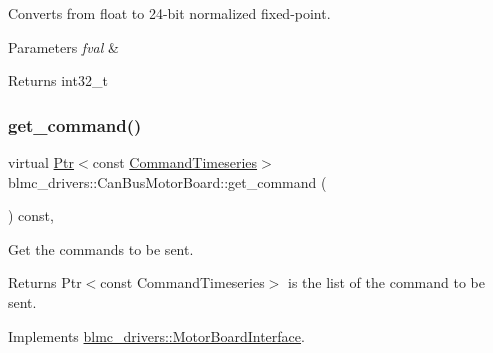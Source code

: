 Converts from float to 24-\/bit normalized fixed-\/point. 


\begin{DoxyParams}{Parameters}
{\em fval} & \\
\hline
\end{DoxyParams}
\begin{DoxyReturn}{Returns}
int32\+\_\+t 
\end{DoxyReturn}
\mbox{\label{classblmc__drivers_1_1CanBusMotorBoard_ac7adb4e5074229bb38e1c288702321e4}} 
\subsubsection{\texorpdfstring{get\+\_\+command()}{get\_command()}}
{\footnotesize\ttfamily virtual \hyperlink{classblmc__drivers_1_1MotorBoardInterface_a6a733b7ed7a3a96f6b0712b6bb5307f8}{Ptr}$<$const \hyperlink{classblmc__drivers_1_1MotorBoardInterface_ae2afe94a023d9f08a4c689e9b7660f15}{Command\+Timeseries}$>$ blmc\+\_\+drivers\+::\+Can\+Bus\+Motor\+Board\+::get\+\_\+command (\begin{DoxyParamCaption}{ }\end{DoxyParamCaption}) const\hspace{0.3cm}{\ttfamily [inline]}, {\ttfamily [virtual]}}



Get the commands to be sent. 

\begin{DoxyReturn}{Returns}
Ptr$<$const Command\+Timeseries$>$ is the list of the command to be sent. 
\end{DoxyReturn}


Implements \hyperlink{classblmc__drivers_1_1MotorBoardInterface_a4913308c1eacc98475aeb8647447c997}{blmc\+\_\+drivers\+::\+Motor\+Board\+Interface}.

\mbox{\label{classblmc__drivers_1_1CanBusMotorBoard_a2a1b44b08e57cd112957a33ceb97ebb4}} 
